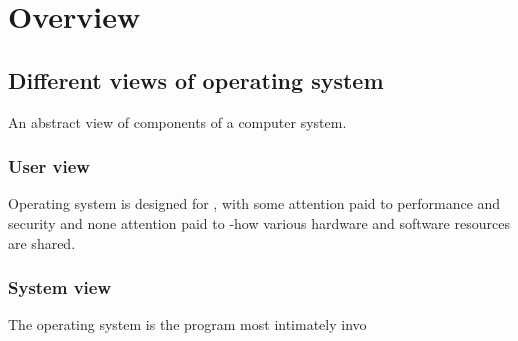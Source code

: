 \chapter{Overview}

\section{Different views of operating system}
    An abstract view of components of a computer system.


\subsection{User view}

Operating system is designed for , with some attention paid
to performance and security and none attention paid to 
-how various hardware and software resources are shared.

\subsection{System view}
The operating system is the program most intimately invo
